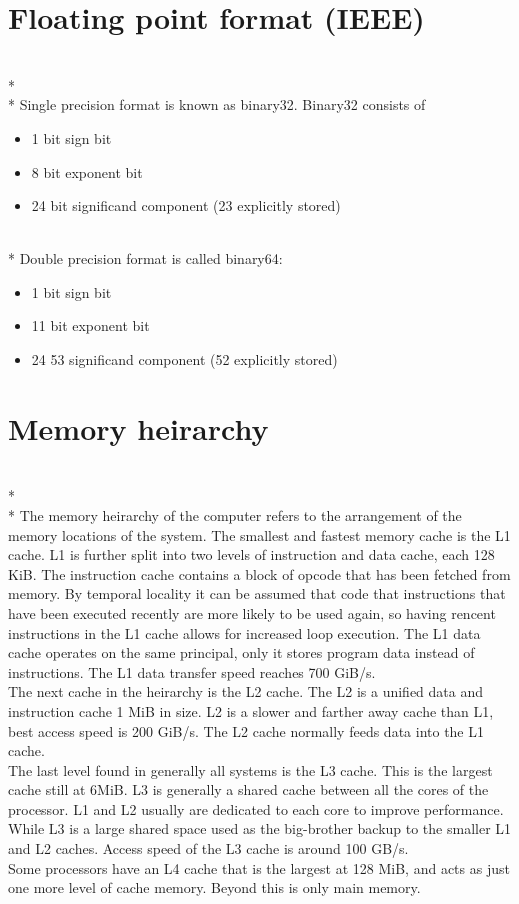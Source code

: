 \documentclass[letterpaper,10pt,titlepage]{article}
\begin{document}
\pagebreak

\section{Floating point format (IEEE)}

    \\*
    \\*
    Single precision format is known as binary32. Binary32 consists of 
    \begin{itemize}
        \item 1 bit sign bit
        \item 8 bit exponent bit
        \item 24 bit significand component (23 explicitly stored)
    \end{itemize}
    \\*
    Double precision format is called binary64:
    \begin{itemize}
        \item 1 bit sign bit
        \item 11 bit exponent bit
        \item 24 53 significand component (52 explicitly stored)
    \end{itemize}

\pagebreak

\section{Memory heirarchy}

    \\*
    \\*
    The memory heirarchy of the computer refers to the arrangement of the memory locations 
    of the system. The smallest and fastest memory cache is the L1 cache. L1 is further split 
    into two levels of instruction and data cache, each 128 KiB. The instruction cache contains a block 
    of opcode that has been fetched from memory. By temporal locality it can be assumed that code
    that instructions that have been executed recently are more likely to be used again, so having 
    rencent instructions in the L1 cache allows for increased loop execution. The L1 data cache operates
    on the same principal, only it stores program data instead of instructions. The L1 data transfer speed
    reaches 700 GiB/s. 
    \\
    The next cache in the heirarchy is the L2 cache. The L2 is a unified data and instruction cache 1 MiB 
    in size. L2 is a slower and farther away cache than L1, best access speed is 200 GiB/s. The L2 cache 
    normally feeds data into the L1 cache. 
    \\
    The last level found in generally all systems is the L3 cache. This is the largest cache still at 6MiB. 
    L3 is generally a shared cache between all the cores of the processor. L1 and L2 usually are dedicated to each 
    core to improve performance. While L3 is a large shared space used as the big-brother backup to the smaller
    L1 and L2 caches. Access speed of the L3 cache is around 100 GB/s. 
    \\
    Some processors have an L4 cache that is the largest at 128 MiB, and acts as just one more level of cache 
    memory. Beyond this is only main memory.
\end{document}
